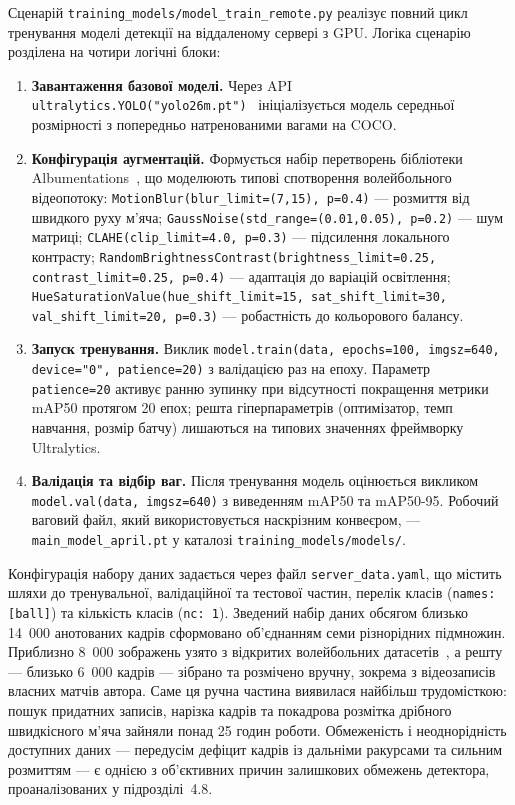 Сценарій \texttt{training\_models/model\_train\_remote.py} реалізує повний цикл
тренування моделі детекції на віддаленому сервері з \gls{GPU}. Логіка сценарію розділена
на чотири логічні блоки:
\begin{enumerate}
    \item \textbf{Завантаження базової моделі.} Через API
    \texttt{ultralytics.YOLO("yolo26m.pt")}~\cite{ultralytics,ultralytics_yolo26}
    ініціалізується модель середньої
    розмірності з попередньо натренованими вагами на COCO.
    \item \textbf{Конфігурація аугментацій.} Формується набір перетворень
    бібліотеки Albumentations~\cite{ultralytics_aug}, що моделюють типові спотворення волейбольного
    відеопотоку: \texttt{MotionBlur(blur\_limit=(7,15), p=0.4)} --- розмиття від
    швидкого руху м'яча; \texttt{GaussNoise(std\_range=(0.01,0.05), p=0.2)} --- шум
    матриці; \texttt{CLAHE(clip\_limit=4.0, p=0.3)} --- підсилення локального
    контрасту; \texttt{RandomBrightnessContrast(brightness\_limit=0.25,
    contrast\_limit=0.25, p=0.4)} --- адаптація до варіацій освітлення;
    \texttt{HueSaturationValue(hue\_shift\_limit=15, sat\_shift\_limit=30,
    val\_shift\_limit=20, p=0.3)} --- робастність до кольорового балансу.
    \item \textbf{Запуск тренування.} Виклик
    \texttt{model.train(data, epochs=100, imgsz=640, device="0", patience=20)} з
    валідацією раз на епоху. Параметр \texttt{patience=20} активує ранню зупинку при
    відсутності покращення метрики mAP50 протягом 20 епох; решта гіперпараметрів
    (оптимізатор, темп навчання, розмір батчу) лишаються на типових значеннях
    фреймворку Ultralytics.
    \item \textbf{Валідація та відбір ваг.} Після тренування модель оцінюється
    викликом \texttt{model.val(data, imgsz=640)} з виведенням mAP50 та mAP50-95.
    Робочий ваговий файл, який використовується наскрізним конвеєром, ---
    \texttt{main\_model\_april.pt} у каталозі \texttt{training\_models/models/}.
\end{enumerate}

Конфігурація набору даних задається через файл
\texttt{server\_data.yaml}, що містить шляхи до тренувальної,
валідаційної та тестової частин, перелік класів (\texttt{names: [ball]}) та
кількість класів (\texttt{nc: 1}). Зведений набір даних обсягом близько 14~000
анотованих кадрів сформовано об'єднанням семи різнорідних підмножин. Приблизно
8~000 зображень узято з відкритих волейбольних датасетів~\cite{roboflow_docs}, а
решту --- близько 6~000 кадрів --- зібрано та розмічено вручну, зокрема з
відеозаписів власних матчів автора. Саме ця ручна частина виявилася найбільш
трудомісткою: пошук придатних записів, нарізка кадрів та покадрова розмітка дрібного
швидкісного м'яча зайняли понад 25 годин роботи. Обмеженість і неоднорідність
доступних даних --- передусім дефіцит кадрів із дальніми ракурсами та сильним
розмиттям --- є однією з об'єктивних причин залишкових обмежень детектора,
проаналізованих у підрозділі~4.8.

